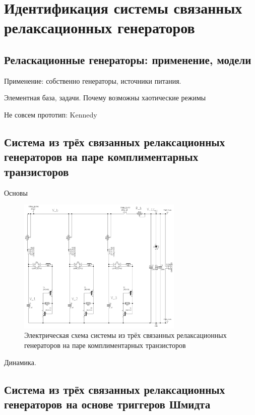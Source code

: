 \chapter{Идентификация системы связанных релаксационных генераторов}

\section{Реласкационные генераторы: применение, модели}

Применение: собственно генераторы, источники питания.

Элементная база, задачи. Почему возможны хаотические режимы

Не совсем прототип: Kennedy


\cite{mishenko_du_small_relax}

\section{Система из трёх связанных релаксационных генераторов на паре комплиментарных транзисторов}
\label{atu:sec:relax3d}

Основы

\begin{figure}[htb!]
  \centerline{\includegraphics[width=0.7\textwidth]{p/relax3d_2bjt_schem.png} }
  \caption{Электрическая схема системы из трёх связанных релаксационных генераторов на паре комплиментарных транзисторов}
  \label{atu:relax3d_schem}
\end{figure}

Динамика.

\section{Система из трёх связанных релаксационных генераторов на основе триггеров Шмидта}
\label{atu:sec:relax3ds}

